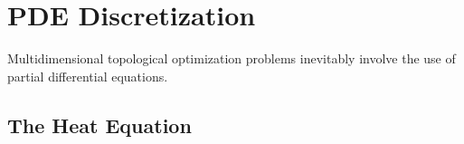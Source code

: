 \section{PDE Discretization}
Multidimensional topological optimization problems inevitably involve the use of partial differential equations.
\subsection{The Heat Equation}